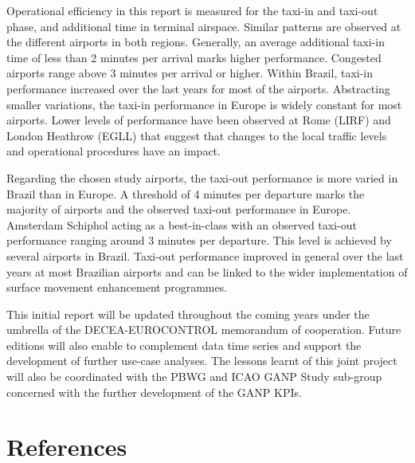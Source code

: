 \documentclass[
]{book}
\begin{document}
Operational efficiency in this report is measured for the taxi-in and taxi-out phase, and additional time in terminal airspace.
Similar patterns are observed at the different airports in both regions.
Generally, an average additional taxi-in time of less than 2 minutes per arrival marks higher performance.
Congested airports range above 3 minutes per arrival or higher.
Within Brazil, taxi-in performance increased over the last years for most of the airports.
Abstracting smaller variations, the taxi-in performance in Europe is widely constant for most airports.
Lower levels of performance have been observed at Rome (LIRF) and London Heathrow (EGLL) that suggest that changes to the local traffic levels and operational procedures have an impact.

Regarding the chosen study airports, the taxi-out performance is more varied in Brazil than in Europe.
A threshold of 4 minutes per departure marks the majority of airports and the observed taxi-out performance in Europe. Amsterdam Schiphol acting as a best-in-class with an observed taxi-out performance ranging around 3 minutes per departure.
This level is achieved by several airports in Brazil.
Taxi-out performance improved in general over the last years at most Brazilian airports and can be linked to the wider implementation of surface movement enhancement programmes.

This initial report will be updated throughout the coming years under the umbrella of the DECEA-EUROCONTROL memorandum of cooperation.
Future editions will also enable to complement data time series and support the development of further use-case analyses.
The lessons learnt of this joint project will also be coordinated with the PBWG and ICAO GANP Study sub-group concerned with the further development of the GANP KPIs.

\hypertarget{references}{%
\chapter{References}\label{references}}

  
\end{document}
